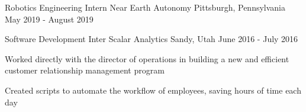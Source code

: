 

\begin{cventries}

  \scventry
    {Robotics Engineering Intern} %
    {Near Earth Autonomy} %
    {Pittsburgh, Pennsylvania} %
    {May 2019 - August 2019} %


  \cventry
    {Software Development Inter}
    {Scalar Analytics}
    {Sandy, Utah}
    {June 2016 - July 2016}
    {
      \begin{cvitems}
      	\item Worked directly with the director of operations in building a new and efficient customer relationship management program
      	\item Created scripts to automate the workflow of employees, saving hours of time each day
      \end{cvitems}
    }


\end{cventries}
